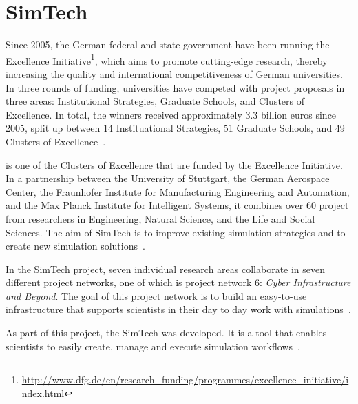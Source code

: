 \section{SimTech}

Since 2005, the German federal and state government have been running the Excellence Initiative\footnote{\url{http://www.dfg.de/en/research_funding/programmes/excellence_initiative/index.html}}, which aims to promote cutting-edge research, thereby increasing the quality and international competitiveness of German universities.
In three rounds of funding, universities have competed with project proposals in three areas: Institutional Strategies, Graduate Schools, and Clusters of Excellence.
In total, the winners received approximately 3.3 billion euros since 2005, split up between 14 Instituational Strategies, 51 Graduate Schools, and 49 Clusters of Excellence~\autocite[pp.~16-18]{excellence:glance}.

 is one of the Clusters of Excellence that are funded by the Excellence Initiative.
In a partnership between the University of Stuttgart, the German Aerospace Center, the Fraunhofer Institute for Manufacturing Engineering and Automation, and the Max Planck Institute for Intelligent Systems, it combines over 60 project from researchers in Engineering, Natural Science, and the Life and Social Sciences.
The aim of SimTech is to improve existing simulation strategies and to create new simulation solutions~\autocite[pp.~109]{excellence:glance}.

In the SimTech project, seven individual research areas collaborate in seven different project networks, one of which is project network 6: \textit{Cyber Infrastructure and Beyond}.
The goal of this project network is to build an easy-to-use infrastructure that supports scientists in their day to day work with simulations~\autocite{simtech:projectnetwork6}.

As part of this project, the SimTech  was developed.
It is a tool that enables scientists to easily create, manage and execute simulation workflows~\autocite{workflow:simulation:flexibility}.
